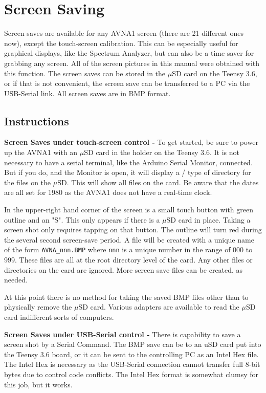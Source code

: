 \section{Screen Saving}
Screen saves are available for any AVNA1 screen (there are 21 different ones now), except the touch-screen calibration.   This can be especially useful for graphical displays, like the Spectrum Analyzer, but can also be a time saver for grabbing any screen.  All of the screen pictures in this manual were obtained with this function.  The screen saves can be stored in the $\mu$SD card on the Teensy 3.6, or if that is not convenient, the screen save can be transferred  to a PC  via the USB-Serial link.  All screen saves are in BMP format.

\subsection{Instructions}
\textbf{Screen Saves under touch-screen control - } To get started,  be sure to power up the AVNA1 with  an $\mu$SD card in the holder on the Teensy 3.6.  It is not necessary to have a serial terminal, like the Arduino Serial Monitor, connected.  But if you do, and the Monitor is open, it will display a  /  type of directory for the files on the $\mu$SD.  This will show all files on the card.   Be aware that the dates are all set for 1980 as the AVNA1 does not have a real-time clock.

In the upper-right hand corner of the screen is a small touch button with green outline and an "S".  This only appears if there is a $\mu$SD card in place.  Taking a screen shot only requires tapping on that button.  The outline will turn red during the several second screen-save period.  A file will be created with a unique name of 
the form \texttt{AVNA\_nnn.BMP} where \texttt{nnn} is a unique number in the range of 000 to 999.  These files are all at the root directory level of the card.  Any other files or directories on the card are ignored.  More screen save files can be created, as needed.

At this point there is no method for taking the saved BMP files other than to physically remove the $\mu$SD card.  Various adapters are available to read the  $\mu$SD card indifferent sorts of computers.

\textbf{Screen Saves under USB-Serial control - } There is capability to save a screen shot by a Serial Command.  The BMP save can be to an uSD card put into the Teensy 3.6 board, or it can be sent to the controlling PC as an Intel Hex file.  The Intel Hex is necessary as the USB-Serial connection cannot transfer full 8-bit bytes due to control code conflicts.  The Intel Hex format is somewhat clumsy for this job, but it works.  

